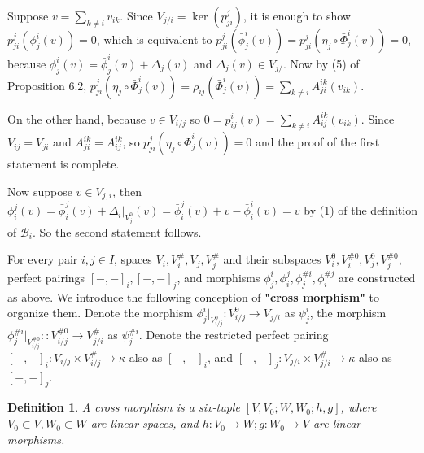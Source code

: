 \def\CTEXPreproc{Created by ctex v0.2.12, don't edit!}\documentclass[11pt]{article}
\newtheorem{defi}{Definition}[section]
\begin{document}
\begin{pf} Suppose $v=\sum_{k\neq i} v_{ik}$. Since $V_{j/i}=\ker (p^j _{ji} ) $,
it is enough to show $p^j _{ji} ( \phi^i _j (v) )=0 $, which is equivalent to
$p^j _{ji} ( \bar{\phi}^i _j (v) )= p^j _{ji}( \eta_j \circ \bar{\Phi}^i _j (v)  )= 0 $, because
$\phi^i _j (v) =\bar{\phi}^i  _j (v) + \Delta_j (v) $ and $\Delta_j (v)\in V_{j/}$.
Now by (5) of Proposition 6.2, $p^j _{ji}( \eta_j\circ \bar{\Phi}^i _j (v)  )=\rho_{ij}( \bar{\Phi}^i _j (v)   )
= \sum_{k\neq i} A^{ik}_{ji} (v_{ik})$.

On the other hand, because $v\in V_{i/j}$ so $0=p^i _{ij}(v)= \sum_{k\neq i}A^{ik}_{ij}(v_{ik})$. Since $V_{ij}=V_{ji}$ and $A^{ik}_{ji}=A^{ik}_{ij}$, so $p^j _{ji}( \eta_j \circ \bar{\Phi}^i _j (v)  )=0$ and the proof of the first statement is complete.

Now suppose $v\in V_{j,i}$, then
$\phi^j _i (v)= \bar{\phi}^j _i (v)+ \Delta_i |_{V^0 _j } (v)=\bar{\phi}^j _i (v) +v-\bar{\phi}^i _i (v)=v $ by (1) of the definition of
$\mathscr{B}_i$. So the second statement follows.\\
\end{pf}




For every pair $i,j\in I$, spaces $V_i , V^{\#}_i , V_j , V^{\#}_j $ and their subspaces $V^0 _i , V^{\# 0}_i , V^0 _j , V^{\# 0}_j   $, perfect pairings $[-,-]_i , [-,-]_j$, and morphisms $\phi^i _j , \phi^j _i , \phi^{\# i}_j ,\phi^{\# j}_i$ are constructed as above. We introduce the following conception of \textbf{"cross morphism"} to organize them. Denote the morphism
$\phi^i _j |_{ V^{0}_{i/j} }:V^{0}_{i/j}  \rightarrow V_{j/i}$ as $\psi^i _j $,  the morphism
$\phi^{\# i}_{j} |_{ V^{\# 0}_{i/j}  }: :V^{\# 0}_{i/j}  \rightarrow V^{\#} _{j/i}   $ as $ \psi^{\# i}_j $.   Denote the restricted perfect pairing $[-,-]_i : V_{i/j} \times V^{\#}_{i/j}\rightarrow \kappa$ also as $[-,-]_i$, and $[-,-]_j : V_{j/i} \times V^{\#}_{j/i}\rightarrow \kappa$ also as $[-,-]_j$.

\begin{defi}
A cross  morphism is a six-tuple $[V, V_0 ; W, W_0 ; h,g   ]$, where $V_0 \subset V , W_0 \subset W$ are linear spaces,
 and $h: V_0 \rightarrow W ; g: W_0 \rightarrow V$ are linear morphisms.
\end{defi}
\end{document}
